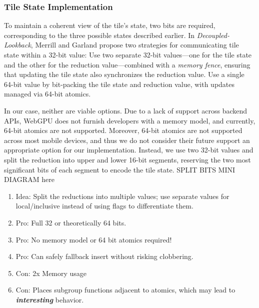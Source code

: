 \documentclass[sigconf]{acmart}
\begin{document}
\subsubsection{Tile State Implementation}
To maintain a coherent view of the tile's state, two bits are required, corresponding to the three possible states described earlier. In \emph{Decoupled-Lookback}, Merrill and Garland propose two strategies for communicating tile state within a 32-bit value: Use two separate 32-bit values—one for the tile state and the other for the reduction value—combined with a \emph{memory fence}, ensuring that updating the tile state also synchronizes the reduction value. Use a single 64-bit value by bit-packing the tile state and reduction value, with updates managed via 64-bit atomics.

In our case, neither are viable options. Due to a lack of support across backend APIs, WebGPU does not furnish developers with a memory model, and currently, 64-bit atomics are not supported. Moreover, 64-bit atomics are not supported across most mobile devices, and thus we do not consider their future support an appropriate option for our implementation. Instead, we use two 32-bit values and split the reduction into upper and lower 16-bit segments, reserving the two most significant bits of each segment to encode the tile state.
\newline
SPLIT BITS MINI DIAGRAM here
\newline

\begin{enumerate}
  \item Idea: Split the reductions into multiple values; use separate values for local/inclusive instead of using flags to differentiate them.
  \item Pro: Full 32 or theoretically 64 bits.
  \item Pro: No memory model or 64 bit atomics required!
  \item Pro: Can safely fallback insert without risking clobbering.
  \item Con: 2x Memory usage
  \item Con: Places subgroup functions adjacent to atomics, which may lead to \textbf{\textit{interesting}} behavior.
\end{enumerate}
\end{document}
